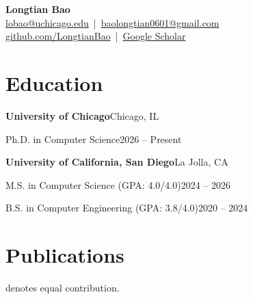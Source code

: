 \documentclass[11pt]{article}
\newcommand{\entry}[2]{\noindent\textbf{#1}\hfill #2\par}
\newcommand{\subentry}[2]{\noindent #1\hfill #2\par}
\begin{document}
\begin{center}
    {\LARGE\bfseries Longtian Bao}\\[4pt]
    \href{mailto:lobao@uchicago.edu}{lobao@uchicago.edu} \,|\,
    \href{mailto:baolongtian0601@gmail.com}{baolongtian0601@gmail.com}\\[2pt]
    \href{https://github.com/LongtianBao}{github.com/LongtianBao} \,|\,
    \href{https://scholar.google.com/citations?user=xX-1jwkAAAAJ&hl=en}{Google Scholar}
\end{center}

\section{Education}
\entry{University of Chicago}{Chicago, IL}
\subentry{Ph.D. in Computer Science}{2026 -- Present}
\entry{University of California, San Diego}{La Jolla, CA}
\subentry{M.S. in Computer Science (GPA: 4.0/4.0)}{2024 -- 2026}
\subentry{B.S. in Computer Engineering (GPA: 3.8/4.0)}{2020 -- 2024}

\section{Publications}
{\small * denotes equal contribution.}
\end{document}
